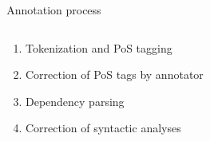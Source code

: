 \documentclass{ltgposter12}
\newcommand\deprel[1]{\\\textsc{#1}}
\begin{document}
\begin{columns}[t]
\begin{column}{0.20\textwidth}
        \vspace{5cm}

        \begin{center}
        \end{center}

        \vspace{7.5cm}

        \begin{center}
        \end{center}
    \end{column}

    \begin{column}{0.45\textwidth}
        \begin{block}{Annotation process}
            \begin{columns}[T]
                \begin{column}{0.45\textwidth}
                    \begin{enumerate}
                        \item Tokenization and PoS tagging
                        \item Correction of PoS tags by annotator
                        \item Dependency parsing
                        \item Correction of syntactic analyses
                    \end{enumerate}
                \end{column}


\end{columns}
\end{block}
\end{column}
\end{columns}
\end{document}
